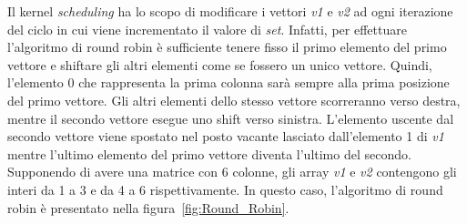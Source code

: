 Il kernel \textit{scheduling} ha lo scopo di modificare i vettori \textit{v1} e  \textit{v2} ad ogni iterazione del ciclo in cui viene incrementato il valore di \textit{set}. Infatti, per effettuare l'algoritmo di round robin è sufficiente tenere fisso il primo elemento del primo vettore e shiftare gli altri elementi come se fossero un unico vettore. Quindi, l'elemento 0 che rappresenta la prima colonna sarà sempre alla prima posizione del primo vettore. Gli altri elementi dello stesso vettore scorreranno verso destra, mentre il secondo vettore esegue uno shift verso sinistra. L'elemento uscente dal secondo vettore viene spostato nel posto vacante lasciato dall'elemento 1 di \textit{v1} mentre l'ultimo elemento del primo vettore diventa l'ultimo del secondo. Supponendo di avere una matrice con 6 colonne, gli array \textit{v1} e \textit{v2} contengono gli interi da 1 a 3 e da 4 a 6 rispettivamente. In questo caso, l'algoritmo di round robin è presentato nella figura~\ref{fig:Round_Robin}.

